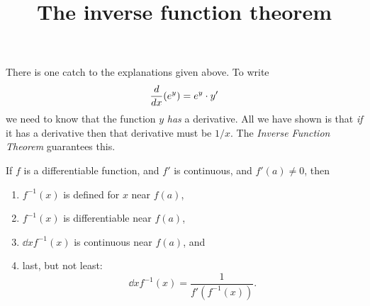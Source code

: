 \documentclass{ximera}
\title[Dig-In:]{The inverse function theorem}
\begin{document}
\begin{abstract}
\end{abstract}
\maketitle

There is one catch to the explanations given above. To write
\[
\frac{d}{dx}(e^y)=e^y\cdot y'
\]
we need to know that the function $y$ \textit{has} a derivative. All
we have shown is that \textit{if} it has a derivative then that
derivative must be $1/x$. The \textit{Inverse Function Theorem}
guarantees this.

\begin{theorem}\label{theorem:IFT}
If $f$ is a differentiable function, and $f'$ is continuous, and
$f'(a) \neq 0$, then
\begin{enumerate}
\item $f^{-1}(x)$ is defined for $x$ near $f(a)$,
\item $f^{-1}(x)$ is differentiable near $f(a)$, 
\item $\dd{x} f^{-1}(x)$ is continuous near $f(a)$, and
\item last, but not least:
  \[
  \dd{x} f^{-1}(x)  = \frac{1}{f'(f^{-1}(x))}.
  \]
\end{enumerate}
\end{theorem}
\end{document}
